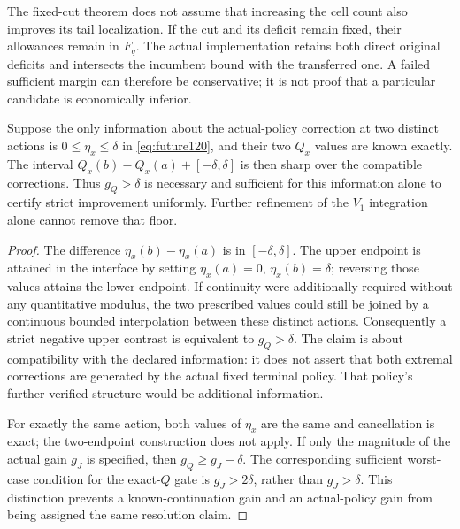 The fixed-cut theorem does not assume that increasing the cell count
also improves its tail localization.  If the cut and its deficit
remain fixed, their allowances remain in $F_q$.  The actual
implementation retains both direct original deficits and
intersects the incumbent bound with the transferred one.
A failed
sufficient margin can therefore be conservative; it is not proof
that a particular candidate is economically inferior.

\begin{proposition}
\label{prop:futurefloor120}
Suppose the only information about the actual-policy correction at
two distinct actions is $0\le\eta_x\le\delta$ in
\eqref{eq:future120}, and their two $Q_x$ values are known
exactly.  The interval
$Q_x(b)-Q_x(a)+[-\delta,\delta]$ is then sharp over the
compatible corrections.  Thus $g_Q>\delta$ is necessary
and sufficient for this information alone to certify strict
improvement uniformly.  Further refinement of the $V_1$
integration alone cannot remove that floor.
\end{proposition}

\begin{proof}
The difference $\eta_x(b)-\eta_x(a)$ is in
$[-\delta,\delta]$.
The upper endpoint is attained in the interface by setting
$\eta_x(a)=0$, $\eta_x(b)=\delta$; reversing those values
attains the lower endpoint.  If continuity were additionally
required without any quantitative modulus, the two prescribed
values could still be joined by a continuous bounded
interpolation between these distinct actions.
Consequently a strict negative upper contrast is equivalent
to $g_Q>\delta$.  The claim is about compatibility with the
declared information: it does not assert that both extremal
corrections are generated by the actual fixed terminal policy.
That policy's further verified structure would be additional
information.

For exactly the same action, both values of $\eta_x$ are the
same and cancellation is exact; the two-endpoint construction
does not apply.  If only the magnitude of the actual gain
$g_J$ is specified, then $g_Q\ge g_J-\delta$.
The corresponding sufficient worst-case condition for the
exact-$Q$ gate is $g_J>2\delta$, rather than $g_J>\delta$.
This distinction prevents a known-continuation gain and an
actual-policy gain from being assigned the same resolution
claim.
\end{proof}

